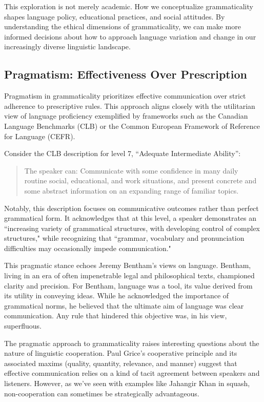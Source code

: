 This exploration is not merely academic. How we conceptualize grammaticality shapes language policy, educational practices, and social attitudes. By understanding the ethical dimensions of grammaticality, we can make more informed decisions about how to approach language variation and change in our increasingly diverse linguistic landscape.

\subsection{Pragmatism: Effectiveness Over Prescription}

Pragmatism in grammaticality prioritizes effective communication over strict adherence to prescriptive rules. This approach aligns closely with the utilitarian view of language proficiency exemplified by frameworks such as the Canadian Language Benchmarks (CLB) or the Common European Framework of Reference for Language (CEFR).

Consider the CLB description for level 7, ``Adequate Intermediate Ability'':

\begin{quote}
The speaker can: Communicate with some confidence in many daily routine social, educational, and work situations, and present concrete and some abstract information on an expanding range of familiar topics.
\end{quote}

Notably, this description focuses on communicative outcomes rather than perfect grammatical form. It acknowledges that at this level, a speaker demonstrates an ``increasing variety of grammatical structures, with developing control of complex structures," while recognizing that ``grammar, vocabulary and pronunciation difficulties may occasionally impede communication."

This pragmatic stance echoes Jeremy Bentham's views on language. Bentham, living in an era of often impenetrable legal and philosophical texts, championed clarity and precision. For Bentham, language was a tool, its value derived from its utility in conveying ideas. While he acknowledged the importance of grammatical norms, he believed that the ultimate aim of language was clear communication. Any rule that hindered this objective was, in his view, superfluous.

The pragmatic approach to grammaticality raises interesting questions about the nature of linguistic cooperation. Paul Grice's cooperative principle and its associated maxims (quality, quantity, relevance, and manner) suggest that effective communication relies on a kind of tacit agreement between speakers and listeners. However, as we've seen with examples like Jahangir Khan in squash, non-cooperation can sometimes be strategically advantageous.


